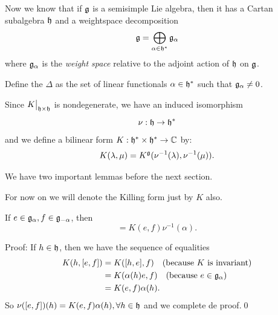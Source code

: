 Now we know that if $\mathfrak{g}$ is a semisimple Lie algebra, then it has a Cartan subalgebra $\mathfrak{h}$ and a weightspace 
decomposition
\begin{equation}
    \mathfrak{g}=\bigoplus_{\alpha\in\mathfrak{h}^*}\mathfrak{g}_\alpha
\end{equation}
where $\mathfrak{g}_\alpha$ is the \textit{weight space} relative to the adjoint action of $\mathfrak{h}$ on $\mathfrak{g}$. 

\begin{dang}
    \begin{definition}
        Define the  $\Delta$ as the set of 
        linear functionals $\alpha\in\mathfrak{h}^*$ such that $\mathfrak{g}_\alpha\neq0$.
    \end{definition}
\end{dang}

Since $K\big|_{\mathfrak{h}\times\mathfrak{h}}$ is nondegenerate, we have an induced isomorphism
\begin{equation}
    \nu:\mathfrak{h}\rightarrow\mathfrak{h}^*
\end{equation}
and we define a bilinear form $K:\mathfrak{h}^*\times\mathfrak{h}^*\to\mathbb{C}$ by:
\begin{equation}
    K(\lambda,\mu)=K^{\mathfrak{g}}(\nu^{-1}(\lambda),\nu^{-1}(\mu)).
\end{equation}

We have two important lemmas before the next section.

\begin{dang}
    \begin{remark}
        For now on we will denote the Killing form just by $K$ also.
    \end{remark}
\end{dang}

\begin{dang}
    \begin{lemma}
        If $e\in\mathfrak{g}_{\alpha},f\in\mathfrak{g}_{-\alpha}$, then 
        \begin{equation}
            [e,f]=K(e,f)\nu^{-1}(\alpha).
        \end{equation}
    \end{lemma}
\end{dang}
Proof: If $h\in\mathfrak{h}$, then we have the sequence of equalities 
\begin{equation}
    \begin{split}
        K(h,[e,f])&=K([h,e],f)\quad(\text{because }K \text{ is invariant})\\
        &=K(\alpha(h)e,f)\quad(\text{because }e\in\mathfrak{g}_\alpha)\\
        &=K(e,f)\alpha(h).
    \end{split}
\end{equation}
So $\nu([e,f])(h)=K(e,f)\alpha(h),\forall h\in\mathfrak{h}$ and we complete de proof.\qed

